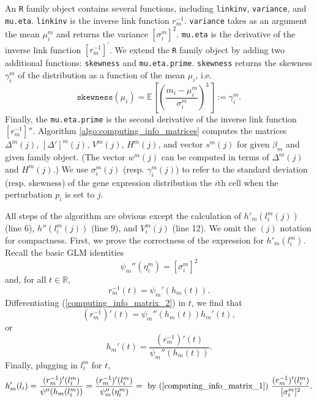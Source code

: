 \documentclass[12pt]{article}
\begin{document}
\begin{appendices}
\begin{refsection}
		An \texttt{R} family object contains several functions, including \texttt{linkinv}, \texttt{variance}, and \texttt{mu.eta}. \texttt{linkinv} is the inverse link function $r_m^{-1}$. \texttt{variance} takes as an argument the mean $\mu^m_i$ and returns the variance $[\sigma_i^m]^2$. \texttt{mu.eta} is the derivative of the inverse link function $[r^{-1}_m]^{'}$. We extend the \texttt{R} family object by adding two additional functions: \texttt{skewness} and \texttt{mu.eta.prime}. \texttt{skewness} returns the skewness $\gamma^m_i$ of the distribution as a function of the mean $\mu_i$, i.e. $$\texttt{skewness}\left(\mu_i\right) = \mathbb{E} \left[\left(\frac{m_i - \mu_i^m}{ \sigma_i^m}\right)^3\right] := \gamma_i^m.$$ Finally, the \texttt{mu.eta.prime} is the second derivative of the inverse link function $[r^{-1}_m]''.$ Algorithm \ref{algo:computing_info_matrices} computes the matrices $\Delta^m(j)$, $[\Delta']^m(j)$, $V^m(j)$, $H^m(j)$, and vector $s^m(j)$ for given $\beta_m$ and given family object. (The vector $w^m(j)$ can be computed in terms of $\Delta^m(j)$ and $H^m(j)$.) We use $\sigma^m_i(j)$ (resp. $\gamma^m_i(j)$) to refer to the standard deviation (resp. skewness) of the gene expression distribution the $i$th cell when the perturbation $p_i$ is set to $j$.
		
		All steps of the algorithm are obvious except the calculation of $h'_m(l^m_i(j))$ (line 6), $h''(l^m_i(j))$ (line 9), and $V^m_i(j)$ (line 12). We omit the $(j)$ notation for compactness. First, we prove the correctness of the expression for $h'_m(l^m_i)$. Recall the basic GLM identities
		\begin{equation}\label{computing_info_matrix_1}
		\psi_m''(\eta_i^m) =  [\sigma^m_i]^2
		\end{equation}
		and, for all $t \in \mathbb{R}$, 
		\begin{equation}\label{computing_info_matrix_2}
		r_m^{-1}(t) = \psi_m'(h_m(t)).
		\end{equation}
		Differentiating (\ref{computing_info_matrix_2}) in $t$, we find that
		\begin{equation}\label{computing_info_matrix_3}
		(r_m^{-1})'(t) = \psi_m''(h_m(t))h_m'(t), 
		\end{equation}
		or  $$h_m'(t) = \frac{(r_m^{-1})'(t) }{\psi_m''(h_m(t))}.$$ Finally, plugging in $l^m_i$ for $t$,
		$$ h_m'(l_i) = \frac{(r_m^{-1})'(l^m_i)}{\psi''(h_m(l^m_i))} = \frac{(r_m^{-1})'(l^m_i)}{\psi_m''(\eta^m_i)} = \textrm{ by (\ref{computing_info_matrix_1}) } \frac{(r_m^{-1})'(l_i^m)}{[\sigma_i^m]^2}.$$
		

\end{refsection}
\end{appendices}
\end{document}
